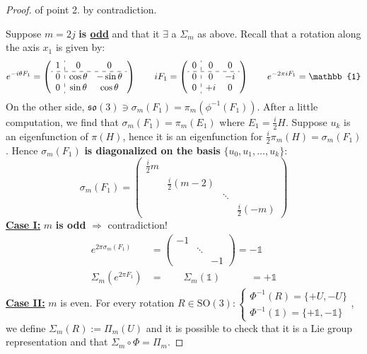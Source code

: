 \documentclass[../main.tex]{subfiles}
\begin{document}
\begin{proof}
of point 2. by contradiction.

Suppose $m=2j$ \textbf{is \underline{odd}} and that it $\exists$ a $\Sigma_m$ as above. Recall that a rotation along the axis $x_1$ is given by:
\[
e^{-i\theta F_1}=\left(\begin{array}{c:cc}
    1 & 0 & 0 \\
    \hdashline
    0 & \cos\theta & -\sin\theta\\
    0 & \sin\theta & \cos\theta
\end{array}\right) 
\qquad 
iF_1=\left(\begin{array}{c:cc}
    0 & 0 & 0 \\
    \hdashline
    0 & 0 & -i\\
    0 & +i & 0
\end{array}\right)
\qquad
e^{-2\pi iF_1}=\mathbb{1}
\]
On the other side, $\mathfrak{so}(3)\ni\sigma_m(F_1)=\pi_m(\phi^{-1}(F_1))$. After a little computation, we find that $\sigma_m(F_1)=\pi_m(E_1)$ where $E_1=\frac{i}{2}H$. Suppose $u_k$ is an eigenfunction of $\pi(H)$, hence it is an eigenfunction for $\frac{i}{2}\pi_m(H)=\sigma_m(F_1)$. Hence $\sigma_m(F_1)$ \textbf{is diagonalized on the basis} $\{u_0,u_1,\dots,u_k\}$:
\[
\sigma_m(F_1)=\left(\begin{array}{cccc}
    \frac{i}{2}m & & & \\
      & \frac{i}{2}(m-2) & & \\
      & & \ddots & \\
      & & & \frac{i}{2}(-m)
\end{array}\right)
\]
\underline{\textbf{Case I:}} $m$ \textbf{is odd} $\Rightarrow$ contradiction!
\begin{align*}
e^{2\pi\sigma_m(F_1)}&=\left(\begin{array}{ccc}
    -1 & & \\
     & \ddots & \\
     & & -1 
\end{array}\right)=-\mathbb{1}\\
\Sigma_m(e^{2\pi F_1})&=\qquad\Sigma_m(\mathbb{1})\qquad\quad=+\mathbb{1}
\end{align*}
\underline{\textbf{Case II:}} $m$ is even. For every rotation $R\in \textrm{SO}(3):\begin{cases}
\Phi^{-1}(R)=\{+U,-U\}\\
\Phi^{-1}(\mathbb{1})=\{+\mathbb{1},-\mathbb{1}\}
\end{cases}$, we define {\color{red}$\Sigma_m(R):=\Pi_m(U)$} and it is possible to check that it is a Lie group representation and that $\Sigma_m\circ\Phi=\Pi_m$.
\end{proof}
\end{document}
